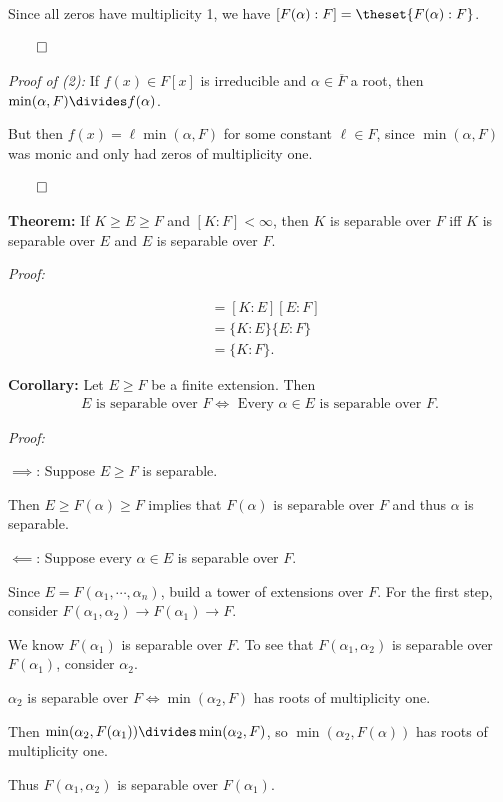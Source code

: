 Since all zeros have multiplicity 1, we have
\([F(\alpha): F] = \theset{F(\alpha): F}\).

\(\qed\)

\emph{Proof of (2):} If \(f(x) \in F[x]\) is irreducible and
\(\alpha\in \overline F\) a root, then
\(\min(\alpha, F) \divides f(\alpha)\).

But then \(f(x) = \ell \min(\alpha, F)\) for some constant
\(\ell \in F\), since \(\min(\alpha, F)\) was monic and only had zeros
of multiplicity one.

\(\qed\)

\textbf{Theorem:} If \(K \geq E \geq F\) and \([K:F] < \infty\), then
\(K\) is separable over \(F\) iff \(K\) is separable over \(E\) and
\(E\) is separable over \(F\).

\emph{Proof:}

\begin{align*}
[K: F]
&= [K:E] [E: F] \\
&= \{K:E\} \{E: F\} \\
&= \{K: F\}
.\end{align*}

\textbf{Corollary:} Let \(E \geq F\) be a finite extension. Then
\begin{align*}
E \text{ is separable over } F \iff \text{ Every } \alpha \in E \text{ is separable over } F
.\end{align*}

\emph{Proof:}

\(\implies\): Suppose \(E \geq F\) is separable.

Then \(E \geq F(\alpha) \geq F\) implies that \(F(\alpha)\) is separable
over \(F\) and thus \(\alpha\) is separable.

\(\impliedby\): Suppose every \(\alpha \in E\) is separable over \(F\).

Since \(E = F(\alpha_1, \cdots, \alpha_n)\), build a tower of extensions
over \(F\). For the first step, consider
\(F(\alpha_1, \alpha_2) \to F(\alpha_1) \to F\).

We know \(F(\alpha_1)\) is separable over \(F\). To see that
\(F(\alpha_1, \alpha_2)\) is separable over \(F(\alpha_1)\), consider
\(\alpha_2\).

\(\alpha_2\) is separable over \(F \iff \min(\alpha_2, F)\) has roots of
multiplicity one.

Then \(\min(\alpha_2, F(\alpha_1)) \divides \min(\alpha_2, F)\), so
\(\min(\alpha_2, F(\alpha))\) has roots of multiplicity one.

Thus \(F(\alpha_1, \alpha_2)\) is separable over \(F(\alpha_1)\).

